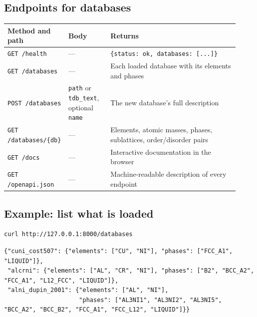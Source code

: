 \documentclass[12pt,a4paper]{article}
\begin{document}
\subsection*{Endpoints for databases}
\begingroup\small
\begin{longtable}{>{\raggedright\arraybackslash}p{0.177\linewidth}>{\raggedright\arraybackslash}p{0.185\linewidth}>{\raggedright\arraybackslash}p{0.558\linewidth}}
\toprule
\textbf{Method and path} & \textbf{Body} & \textbf{Returns} \\
\midrule
\endhead
\texttt{GET /\allowbreak{}health} & --- & \texttt{\{\textquotedbl{}status\textquotedbl{}: \textquotedbl{}ok\textquotedbl{},\allowbreak{} \textquotedbl{}databases\textquotedbl{}: [.\allowbreak{}.\allowbreak{}.\allowbreak{}]\}} \\
\texttt{GET /\allowbreak{}databases} & --- & Each loaded database with its elements and phases \\
\texttt{POST /\allowbreak{}databases} & \texttt{path} or \texttt{tdb\_\allowbreak{}text}, optional \texttt{name} & The new database's full description \\
\texttt{GET /\allowbreak{}databases/\allowbreak{}\{db\}} & --- & Elements, atomic masses, phases, sublattices, order/disorder pairs \\
\texttt{GET /\allowbreak{}docs} & --- & Interactive documentation in the browser \\
\texttt{GET /\allowbreak{}openapi.\allowbreak{}json} & --- & Machine-readable description of every endpoint \\
\bottomrule
\end{longtable}
\endgroup

\subsection*{Example: list what is loaded}
\begin{lstlisting}[basicstyle={\footnotesize\ttfamily},language=bash]
curl http://127.0.0.1:8000/databases
\end{lstlisting}
\begin{lstlisting}[basicstyle={\scriptsize\ttfamily}]
{"cuni_cost507": {"elements": ["CU", "NI"], "phases": ["FCC_A1", "LIQUID"]},
 "alcrni": {"elements": ["AL", "CR", "NI"], "phases": ["B2", "BCC_A2", "FCC_A1", "L12_FCC", "LIQUID"]},
 "alni_dupin_2001": {"elements": ["AL", "NI"],
                     "phases": ["AL3NI1", "AL3NI2", "AL3NI5", "BCC_A2", "BCC_B2", "FCC_A1", "FCC_L12", "LIQUID"]}}
\end{lstlisting}
\end{document}
